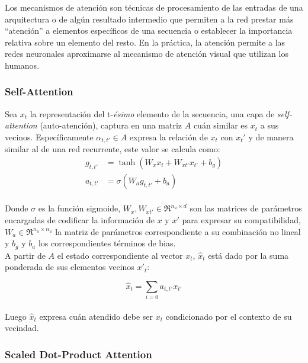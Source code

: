 	Los mecanismos de atención son técnicas de procesamiento de las entradas de una arquitectura o de algún resultado intermedio que permiten a la red prestar más ``atención'' a elementos específicos de una secuencia o establecer la importancia relativa sobre un elemento del resto. En la práctica, la atención permite a las redes neuronales aproximarse al mecanismo de atención visual que utilizan los humanos.

	\subsubsection{Self-Attention}
	
		Sea $x_t$ la representación del t-\textit{\'{e}simo} elemento de la secuencia, una capa de \textit{self-attention} (auto-atención), captura en una matriz $A$ cuán similar es $x_t$ a sus vecinos. Específicamente $\alpha_{t, t'} \in A$ expresa la relación de $x_t$ con $x_t'$ y de manera similar al de una red recurrente, este valor se calcula como:
		\begin{equation}
			\begin{split}
				g_{t, t'} &= \tanh(W_{x}x_t + W_{x{t'}}x_{t'} + b_g)\\
				a_{t, t'} &= \sigma({W_{a}g_{t, t'} + b_{a}}) 
			\end{split}
		\end{equation}
		\\
		Donde $\sigma$ es la función sigmoide, $W_{x}, W_{x{t'}} \in \Re^{n_u \times d} $ son las matrices de parámetros encargadas de codificar la información de $x \text{ y } x'$ para expresar su compatibilidad, $W_a \in \Re^{n_u \times n_u}$ la matriz de parámetros correspondiente a su combinación no lineal y $b_g \text{ y } b_a$ los correspondientes términos de bias.
		\\
		A partir de $A$ el estado correspondiente al vector $x_t$, $\hat{x}_t$ está dado por la suma ponderada de sus elementos vecinos $x'_t$:
		
		\begin{equation} \label{attention}
			\hat{x}_t = \sum \limits_{i=0} a_{t,t'}x_{t'}
		\end{equation}
		\\
		Luego $\hat{x}_t$ expresa cuán atendido debe ser $x_t$ condicionado por el contexto de su vecindad.
	
	\subsubsection{Scaled Dot-Product Attention}
		
